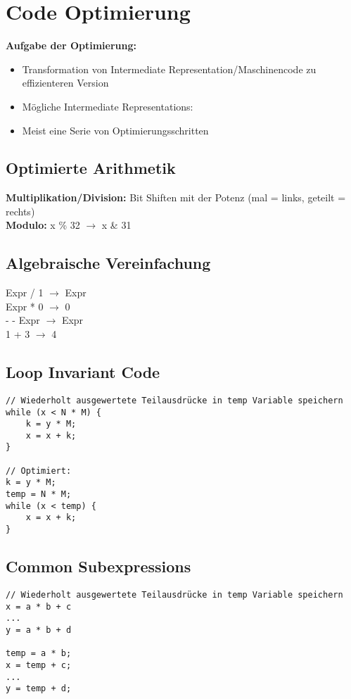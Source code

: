 
\section{Code Optimierung}
\textbf{Aufgabe der Optimierung:}
\begin{itemize}[topsep=0pt]
    \itemsep -0.2em
    \item Transformation von Intermediate Representation/Maschinencode zu effizienteren Version
    \item Mögliche Intermediate Representations:
    \item Meist eine Serie von Optimierungsschritten
\end{itemize}

\subsection{Optimierte Arithmetik}
\textbf{Multiplikation/Division:} Bit Shiften mit der Potenz (mal = links, geteilt = rechts)\\
\textbf{Modulo:} x \% 32 $\rightarrow$ x \& 31

\subsection{Algebraische Vereinfachung}
Expr / 1 $\rightarrow$ Expr\\
Expr * 0 $\rightarrow$ 0\\
- - Expr $\rightarrow$ Expr\\
1 + 3 $\rightarrow$ 4

\subsection{Loop Invariant Code}
\begin{lstlisting}
// Wiederholt ausgewertete Teilausdrücke in temp Variable speichern
while (x < N * M) {
    k = y * M;
    x = x + k;
}

// Optimiert:
k = y * M;
temp = N * M;
while (x < temp) {
    x = x + k;
}
\end{lstlisting}

\subsection{Common Subexpressions}
\begin{lstlisting}
// Wiederholt ausgewertete Teilausdrücke in temp Variable speichern
x = a * b + c
...
y = a * b + d

temp = a * b;
x = temp + c;
...
y = temp + d;
\end{lstlisting}

